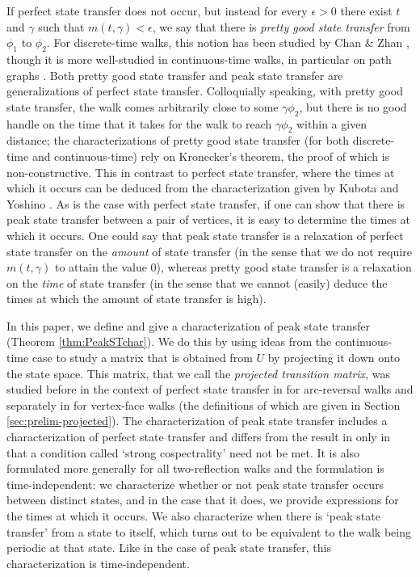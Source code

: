 \documentclass{article}
\numberwithin{equation}{section}
\begin{document}
If perfect state transfer does not occur, but instead for every $\epsilon > 0$ there exist $t$ and $\gamma$ such that $m(t,\gamma) < \epsilon$, we say that there is \textsl{pretty good state transfer} from $\phi_1$ to $\phi_2$. For discrete-time walks, this notion has been studied by Chan \& Zhan \cite{ChaZha2023}, though it is more well-studied in continuous-time walks, in particular on path graphs \cite{GodKirSev2012,VinZhe2012,BanCouGod2017,CouGuoBom2017,Bom2019,ChaSin2023}. Both pretty good state transfer and peak state transfer are generalizations of perfect state transfer. Colloquially speaking, with pretty good state transfer, the walk comes arbitrarily close to some $\gamma \phi_2$, but there is no good handle on the time that it takes for the walk to reach $\gamma \phi_2$ within a given distance; the characterizations of pretty good state transfer (for both discrete-time and continuous-time) rely on Kronecker's theorem, the proof of which is non-constructive. This in contrast to perfect state transfer, where the times at which it occurs can be deduced from the characterization given by Kubota and Yoshino \cite{KubYos2024}. As is the case with perfect state transfer, if one can show that there is peak state transfer between a pair of vertices, it is easy to determine the times at which it occurs. One could say that peak state transfer is a relaxation of perfect state transfer on the \textsl{amount} of state transfer (in the sense that we do not require $m(t,\gamma)$ to attain the value $0$), whereas pretty good state transfer is a relaxation on the \textsl{time} of state transfer (in the sense that we cannot (easily) deduce the times at which the amount of state transfer is high).

In this paper, we define and give a characterization of peak state transfer (Theorem \ref{thm:PeakSTchar}). We do this by using ideas from the continuous-time case to study a matrix that is obtained from $U$ by projecting it down onto the state space. This matrix, that we call the \textsl{projected transition matrix}, was studied before in the context of perfect state transfer in \cite{KubSeg2022} for arc-reversal walks and separately in \cite{GuoSch2024} for vertex-face walks (the definitions of which are given in Section \ref{sec:prelim-projected}). The characterization of peak state transfer includes a characterization of perfect state transfer and differs from the result in \cite{KubYos2024} only in that a condition called `strong cospectrality' need not be met. It is also formulated more generally for all two-reflection walks and the formulation is time-independent: we characterize whether or not peak state transfer occurs between distinct states, and in the case that it does, we provide expressions for the times at which it occurs. We also characterize when there is `peak state transfer' from a state to itself, which turns out to be equivalent to the walk being periodic at that state. Like in the case of peak state transfer, this characterization is time-independent.
\end{document}
